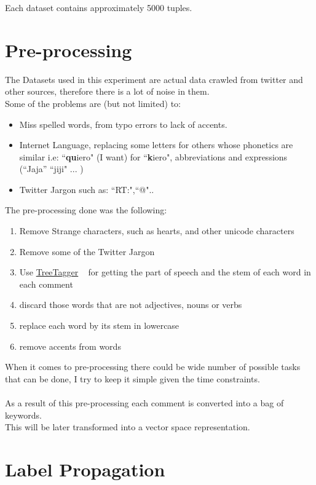 \documentclass[4pt,a4paper,twocolumn]{article}
\begin{document}
Each dataset contains approximately 5000 tuples.

\section{Pre-processing}

The Datasets used in this experiment are actual data crawled from twitter and other sources, therefore there is a lot of noise in them.\\
Some of the problems are (but not limited) to:\\
\begin{itemize}
	\item Miss spelled words, from typo errors to lack of accents.
	\item Internet Language, replacing some letters for others whose phonetics are similar i.e: ``\textbf{qu}iero" (I want) for ``\textbf{k}iero", abbreviations and expressions (``Jaja'' ``jiji" ... )
	\item Twitter Jargon such as: ``RT:",``@"..
\end{itemize} 

The pre-processing done was the following:
\begin{enumerate}
	\item Remove Strange characters, such as hearts, and other unicode characters
	\item Remove some of the Twitter Jargon 
	\item Use \href{http://www.ims.uni-stuttgart.de/projekte/corplex/TreeTagger/}{TreeTagger} ~\cite{Schmid94probabilisticpart-of-speech} for getting the part of speech and the stem of each word in each comment
	\item discard those words that are not adjectives, nouns or verbs
	\item replace each word by its stem in lowercase
	\item remove accents from words
\end{enumerate}

When it comes to pre-processing there could be wide number of possible 
tasks that can be done, I try to keep it simple given the time constraints. \\
\\
As a result of this pre-processing each comment is converted into a bag of keywords.\\
This will be later transformed into a vector space representation.




\section{Label Propagation}
\end{document}

